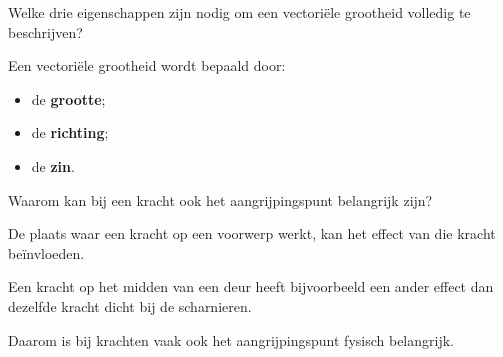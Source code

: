 \documentclass{ximera}
\begin{document}
\begin{oefening}{\oefB\ESS}

\begin{question}
Welke drie eigenschappen zijn nodig om een vectoriële grootheid volledig te
beschrijven?

\begin{oplossing}
Een vectoriële grootheid wordt bepaald door:

\begin{itemize}
    \item de \textbf{grootte};
    \item de \textbf{richting};
    \item de \textbf{zin}.
\end{itemize}
\end{oplossing}
\end{question}


\begin{question}
Waarom kan bij een kracht ook het aangrijpingspunt belangrijk zijn?

\begin{oplossing}
De plaats waar een kracht op een voorwerp werkt, kan het effect van die kracht
beïnvloeden.

Een kracht op het midden van een deur heeft bijvoorbeeld een ander effect dan
dezelfde kracht dicht bij de scharnieren.

Daarom is bij krachten vaak ook het aangrijpingspunt fysisch belangrijk.
\end{oplossing}
\end{question}

\end{oefening}
\end{document}
